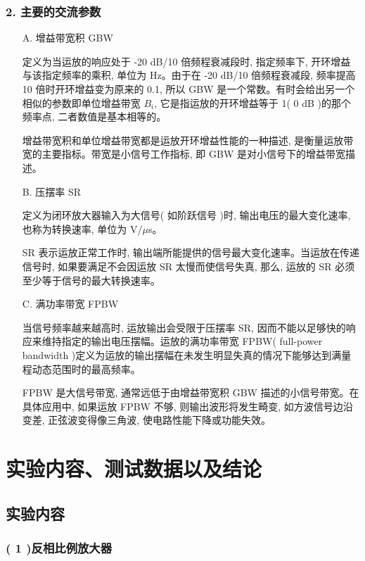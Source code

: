 \documentclass[10pt, a4paper]{article} %
\begin{document}
\subsubsection*{2. 主要的交流参数}

\begin{enumerate}
    \item[A.] 增益带宽积 GBW
    
    定义为当运放的响应处于 -20 dB/10 倍频程衰减段时, 指定频率下, 开环增益与该指定频率的乘积, 单位为 Hz。由于在 -20 dB/10 倍频程衰减段, 频率提高 10 倍时开环增益变为原来的 0.1, 所以 GBW 是一个常数。有时会给出另一个相似的参数即单位增益带宽 $B_i$, 它是指运放的开环增益等于 1( 0 dB )的那个频率点, 二者数值是基本相等的。
    
    增益带宽积和单位增益带宽都是运放开环增益性能的一种描述, 是衡量运放带宽的主要指标。带宽是小信号工作指标, 即 GBW 是对小信号下的增益带宽描述。
    
    \item[B.] 压摆率 SR
    
    定义为闭环放大器输入为大信号( 如阶跃信号 )时, 输出电压的最大变化速率, 也称为转换速率, 单位为 V/$\mu$s。
    
    SR 表示运放正常工作时, 输出端所能提供的信号最大变化速率。当运放在传递信号时, 如果要满足不会因运放 SR 太慢而使信号失真, 那么, 运放的 SR 必须至少等于信号的最大转换速率。
    
    \item[C.] 满功率带宽 FPBW
    
    当信号频率越来越高时, 运放输出会受限于压摆率 SR, 因而不能以足够快的响应来维持指定的输出电压摆幅。运放的满功率带宽 FPBW( full-power bandwidth )定义为运放的输出摆幅在未发生明显失真的情况下能够达到满量程动态范围时的最高频率。
    
    FPBW 是大信号带宽, 通常远低于由增益带宽积 GBW 描述的小信号带宽。在具体应用中, 如果运放 FPBW 不够, 则输出波形将发生畸变, 如方波信号边沿变差, 正弦波变得像三角波, 使电路性能下降或功能失效。
\end{enumerate}

\clearpage
\section{实验内容、测试数据以及结论}

\subsection{实验内容}
\subsubsection*{( 1 )反相比例放大器}
\end{document}
